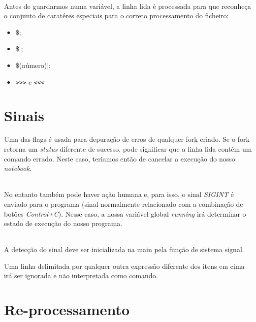 \documentclass[11pt,a4paper]{report}
\begin{document}

~\\

Antes de guardarmos numa variável, a linha lida é processada para que reconheça o conjunto de caratéres especiais para o correto processamento do ficheiro:

\begin{itemize}
\item \$; 
\item \$|;
\item \$(número)|;
\item \verb|>>>| e \verb|<<<|
\end{itemize}


\section{Sinais}

Uma das flags é usada para depuração de erros de qualquer fork criado. Se o fork retorna um \textit{status} diferente de sucesso, pode significar que a linha lida contém um comando errado.
Neste caso, teriamos então de cancelar a execução do nosso \textit{notebook}.



~\\

No entanto também pode haver ação humana e, para isso, o sinal \textit{SIGINT} é enviado para o programa (sinal normalmente relacionado com a combinação de botões \textit{Control+C}).
Nesse caso, a nossa variável global \textit{running} irá determinar o estado de execução do nosso programa.


~\\

A detecção do sinal deve ser inicializada na main pela função de sistema signal.



Uma linha delimitada por qualquer outra expressão diferente dos itens em cima irá ser ignorada e não interpretada como comando.


\raggedbottom
\pagebreak
\section{Re-processamento}
\end{document}
